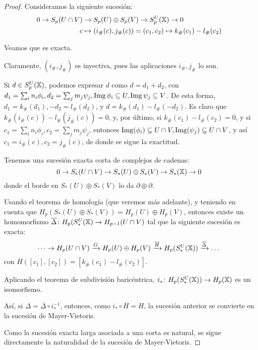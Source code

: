 \begin{proof}
  Consideramos la siguiente sucesión:
  \begin{align*}
    0 \to S_p(U \cap V) &\to S_p(U) \oplus S_p(V) \to S_p^U({\mathbb X}) \to 0 \\
                    c &\mapsto (i_\#(c), j_\#(c)) =  (c_1, c_2) \mapsto k_\#(c_1) - l_\#(c_2)
  \end{align*}

  Veamos que es exacta.

  Claramente, $(i_\#, j_\#)$ es inyectiva, pues las aplicaciones $i_\#, j_\#$ lo son.

  Si $d \in S_p^U({\mathbb X})$, podemos expresar $d$ como $d = d_1 + d_2$, con $d_1 = \sum_i n_i \phi_i, d_2 = \sum_j m_j \psi_j,
  \operatorname{Img} \phi_i \subseteq U, \operatorname{Img} \psi_j \subseteq V$. De esta forma, $d_1 = k_\#(d_1), -d_2 = l_\#(d_2)$, y $d = k_\#(d_1) - l_\#(-d_2)$.
  Es claro que $k_\#(i_\#(c)) - l_\#(j_\#(c)) = 0$, y, por último, si $k_\#(c_1) - l_\#(c_2) = 0$, y si $c_1 = \sum_i n_i \phi_i,
  c_2 = \sum_j m_j \psi_j$, entonces $\operatorname{Img}(\phi_i) \subseteq U \cap V, \operatorname{Img}(\psi_j) \subseteq U \cap V$, y así $c_1 = i_\#(c), c_2 = j_\#(c)$,
  de donde se sigue la exactitud.

  Tenemos una sucesión exacta corta de complejos de cadenas:
  \[ 0 \to S_*(U \cap V) \to S_*(U) \oplus S_*(V) \to S_*({\mathbb X}) \to 0 \]
  donde el borde en $S_*(U) \oplus S_*(V)$ lo da $\partial \oplus \partial$.

  Usando el teorema de homología (que veremos más adelante), y teniendo en cuenta que $H_p(S_*(U) \oplus S_*(V)) = H_p(U) \oplus H_p(V)$,
  entonces existe un homomorfismo $\overline{\Delta} \colon H_p(S_*^U({\mathbb X}) \to H_{p-1}(U \cap V)$ tal que la siguiente sucesión es exacta:
  \[ \dots \to H_p(U \cap V) \xrightarrow{G} H_p(U) \oplus H_p(V) \xrightarrow{\overline{H}} H_p(S_*^U({\mathbb X})) \xrightarrow{\overline{\Delta}} \dots \]
  con $\overline{H}([c_1], [c_2]) = [k_\#(c_1) - l_\#(c_2)]$.

  Aplicando el teorema de subdivisión baricéntrica, $i_* \colon H_p(S_*^U({\mathbb X})) \to H_p({\mathbb X})$ es un isomorfismo.

  Así, si $\Delta = \overline{\Delta} \circ i_*^{-1}$, entonces, como $i_* \circ \overline{H} = H$, la sucesión anterior se convierte
  en la sucesión de Mayer-Vietoris.

  Como la sucesión exacta larga asociada a una corta es natural, se sigue directamente la naturalidad de la sucesión de Mayer-Vietoris.
\end{proof}

